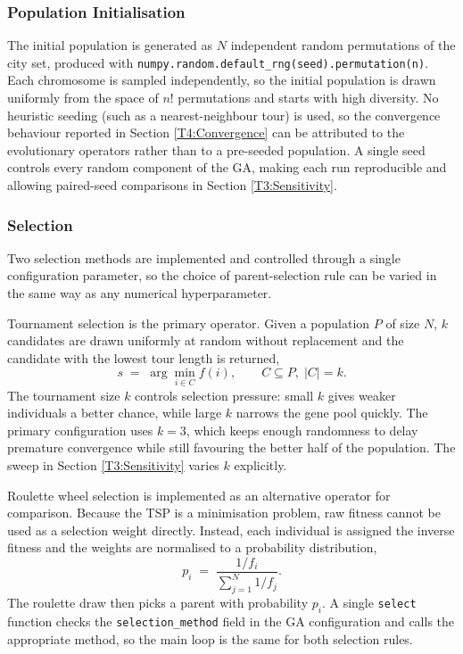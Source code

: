 \subsubsection{Population Initialisation}
\label{T2:Init}
The initial population is generated as $N$ independent random permutations
of the city set, produced with
\texttt{numpy.random.default\_rng(seed).permutation(n)}. Each chromosome is
sampled independently, so the initial population is drawn uniformly from
the space of $n!$ permutations and starts with high diversity. No
heuristic seeding (such as a nearest-neighbour tour) is used, so
the convergence behaviour reported in Section \ref{T4:Convergence}
can be attributed to the evolutionary operators rather than to a
pre-seeded population. A single seed controls every random component of the GA,
making each run reproducible and allowing paired-seed comparisons in
Section \ref{T3:Sensitivity}.

\subsubsection{Selection}
\label{T2:Selection}
Two selection methods are implemented and controlled through a single
configuration parameter, so the choice of parent-selection rule can be
varied in the same way as any numerical hyperparameter.

Tournament selection is the primary operator. Given a population $P$ of
size $N$, $k$ candidates are drawn uniformly at random without replacement
and the candidate with the lowest tour length is returned,
\begin{equation}
s \;=\; \arg\min_{i \in C} f(i), \qquad C \subseteq P,\; |C| = k.
\end{equation}
The tournament size $k$ controls selection pressure: small $k$ gives weaker
individuals a better chance, while large $k$ narrows the gene pool quickly.
The primary configuration uses $k = 3$, which keeps enough randomness to
delay premature convergence while still favouring the better half of the
population. The sweep in Section \ref{T3:Sensitivity} varies $k$
explicitly.

Roulette wheel selection is implemented as an alternative operator for
comparison. Because the TSP is a minimisation problem, raw fitness cannot
be used as a selection weight directly. Instead, each individual is
assigned the inverse fitness and the weights are normalised to a
probability distribution,
\begin{equation}
p_i \;=\; \frac{1/f_i}{\sum_{j=1}^{N} 1/f_j}.
\end{equation}
The roulette draw then picks a parent with probability $p_i$. A single
\texttt{select} function checks the \texttt{selection\_method} field in the
GA configuration and calls the appropriate method, so the main loop
is the same for both selection rules.

